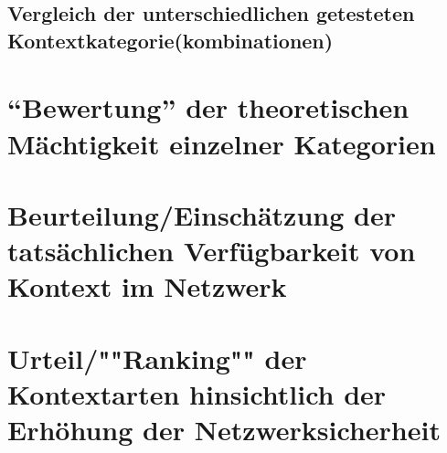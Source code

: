 \subsection{ Vergleich der unterschiedlichen getesteten Kontextkategorie(kombinationen)} 

\section{ “Bewertung” der theoretischen Mächtigkeit einzelner Kategorien} 
\section{ Beurteilung/Einschätzung der tatsächlichen Verfügbarkeit von Kontext im Netzwerk }
\section{ Urteil/""Ranking"" der Kontextarten hinsichtlich der Erhöhung der Netzwerksicherheit}
